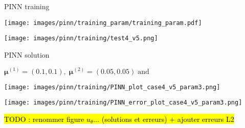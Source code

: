 \begin{frame}{PINN training}
    \vspace{-7pt}
    \vspace{3pt}    
    \begin{center}
        \begin{minipage}{0.62\linewidth}
            \centering
            \vspace{-8pt}
            \texttt{[image: images/pinn/training\_param/training\_param.pdf]}
        \end{minipage}
        \begin{minipage}{0.36\linewidth}
            \centering
            \texttt{[image: images/pinn/training/test4\_v5.png]}
        \end{minipage}
    \end{center}
    
    \vspace{-8pt}
\end{frame}

\begin{frame}{PINN solution}
    \vspace{-5pt}
    \begin{center}
        $\bm{\mu}^{(1)} = (0.1,0.1), \; \bm{\mu}^{(2)} = (0.05,0.05) \; \text{and} \;$

        \texttt{[image: images/pinn/training/PINN\_plot\_case4\_v5\_param3.png]}
        
        \texttt{[image: images/pinn/training/PINN\_error\_plot\_case4\_v5\_param3.png]}
    \end{center}

    \hl{TODO : renommer figure $u_\theta\dots$ (solutions et erreurs) + ajouter erreurs L2}

\end{frame}